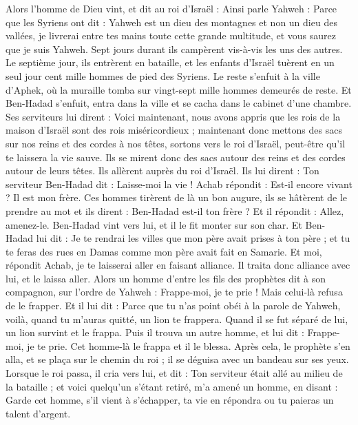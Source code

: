 \begin{multicols}{2}
Alors l'homme de Dieu vint, et dit au roi d'Israël : Ainsi parle Yahweh : Parce que les Syriens ont dit : Yahweh est un dieu des montagnes et non un dieu des vallées, je livrerai entre tes mains toute cette grande multitude, et vous saurez que je suis Yahweh.
Sept jours durant ils campèrent vis-à-vis les uns des autres. Le septième jour, ils entrèrent en bataille, et les enfants d'Israël tuèrent en un seul jour cent mille hommes de pied des Syriens.
Le reste s'enfuit à la ville d'Aphek, où la muraille tomba sur vingt-sept mille hommes demeurés de reste. Et Ben-Hadad s'enfuit, entra dans la ville et se cacha dans le cabinet d'une chambre. 
Ses serviteurs lui dirent : Voici maintenant, nous avons appris que les rois de la maison d'Israël sont des rois miséricordieux ; maintenant donc mettons des sacs sur nos reins et des cordes à nos têtes, sortons vers le roi d'Israël, peut-être qu'il te laissera la vie sauve.
Ils se mirent donc des sacs autour des reins et des cordes autour de leurs têtes. Ils allèrent auprès du roi d'Israël. Ils lui dirent : Ton serviteur Ben-Hadad dit : Laisse-moi la vie ! Achab répondit : Est-il encore vivant ? Il est mon frère.
Ces hommes tirèrent de là un bon augure, ils se hâtèrent de le prendre au mot et ils dirent : Ben-Hadad est-il ton frère ? Et il répondit : Allez, amenez-le. Ben-Hadad vint vers lui, et il le fit monter sur son char.
Et Ben-Hadad lui dit : Je te rendrai les villes que mon père avait prises à ton père ; et tu te feras des rues en Damas comme mon père avait fait en Samarie. Et moi, répondit Achab, je te laisserai aller en faisant alliance. Il traita donc alliance avec lui, et le laissa aller.
Alors un homme d'entre les fils des prophètes dit à son compagnon, sur l'ordre de Yahweh : Frappe-moi, je te prie ! Mais celui-là refusa de le frapper.
Et il lui dit : Parce que tu n'as point obéi à la parole de Yahweh, voilà, quand tu m'auras quitté, un lion te frappera. Quand il se fut séparé de lui, un lion survint et le frappa.
Puis il trouva un autre homme, et lui dit : Frappe-moi, je te prie. Cet homme-là le frappa et il le blessa.
Après cela, le prophète s'en alla, et se plaça sur le chemin du roi ; il se déguisa avec un bandeau sur ses yeux.
Lorsque le roi passa, il cria vers lui, et dit : Ton serviteur était allé au milieu de la bataille ; et voici quelqu'un s'étant retiré, m'a amené un homme, en disant : Garde cet homme, s'il vient à s'échapper, ta vie en répondra ou tu paieras un talent d'argent.

\end{multicols}
